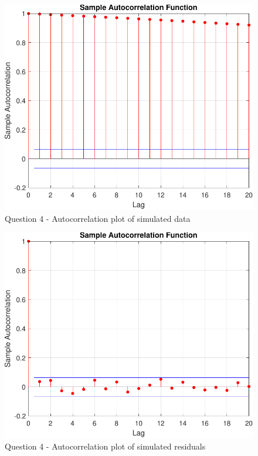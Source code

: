 \documentclass[11pt]{article}
\begin{document}
\begin{enumerate}
\begin{figure}[htp]
\centering
\includegraphics[scale=0.75]{data-simulated-autocorrelation-plot.pdf}
\caption{Question 4 - Autocorrelation plot of simulated data}
\label{fig:q4-data-simulated-autocorrplot}
\end{figure}

\begin{figure}[htp]
\centering
\includegraphics[scale=0.75]{residual-simulated-autocorrelation-plot.pdf}
\caption{Question 4 - Autocorrelation plot of simulated residuals}
\label{fig:q4-residual-simulated-autocorrplot}
\end{figure}


\end{enumerate}
\end{document}
